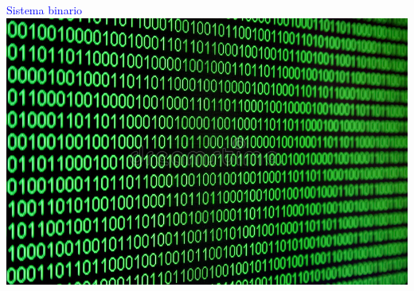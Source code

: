 \documentclass[10pt,xcolor={dvipsnames}]{beamer}
\begin{document}
\begin{frame}
\begin{center}
\Huge{\textcolor{blue}{Sistema binario}} \\ \vspace{0.5cm} \pause
\includegraphics[scale=1.0]{Figures/2binario}
\end{center}
\end{frame}
\end{document}
